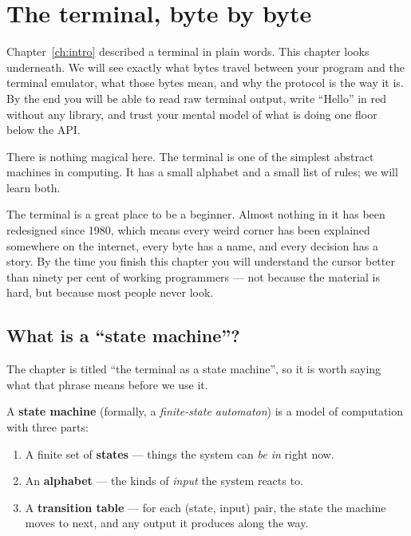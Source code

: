 \chapter{The terminal, byte by byte}
\label{ch:terminal}

Chapter~\ref{ch:intro} described a terminal in plain words. This
chapter looks underneath. We will see exactly what bytes travel
between your program and the terminal emulator, what those bytes mean,
and why the protocol is the way it is. By the end you will be able to
read raw terminal output, write ``Hello'' in red without any library,
and trust your mental model of what \maya{} is doing one floor below
the API.

There is nothing magical here. The terminal is one of the simplest
abstract machines in computing. It has a small alphabet and a small
list of rules; we will learn both.

\begin{aside}
The terminal is a great place to be a beginner. Almost nothing in it
has been redesigned since 1980, which means every weird corner has
been explained somewhere on the internet, every byte has a name, and
every decision has a story. By the time you finish this chapter you
will understand the cursor better than ninety per cent of working
programmers --- not because the material is hard, but because most
people never look.
\end{aside}


\section{What is a ``state machine''?}
\label{sec:term:fsm}

The chapter is titled ``the terminal as a state machine'', so it is
worth saying what that phrase means before we use it.

A \textbf{state machine} (formally, a \emph{finite-state automaton})
is a model of computation with three parts:

\begin{enumerate}[leftmargin=*]
  \item A finite set of \textbf{states} --- things the system can
    \emph{be in} right now.
  \item An \textbf{alphabet} --- the kinds of \emph{input}
    the system reacts to.
  \item A \textbf{transition table} --- for each (state, input)
    pair, the state the machine moves to next, and any output it
    produces along the way.
\end{enumerate}

